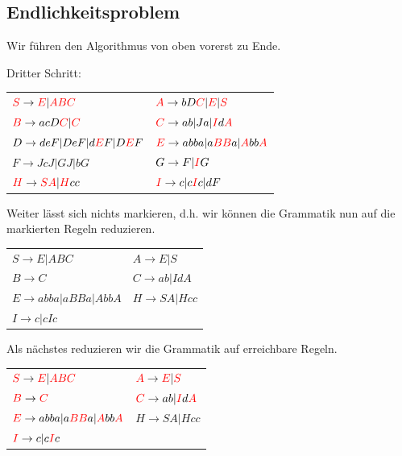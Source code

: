 \documentclass{article}
\begin{document}
\subsection*{Endlichkeitsproblem}
Wir führen den Algorithmus von oben vorerst zu Ende.
\begin{center}
Dritter Schritt:\\
\begin{tabular}{ll}
${\color{red}S} \rightarrow {\color{red}E} | {\color{red}ABC}$  & ${\color{red}A} \rightarrow bD{\color{red}C} | {\color{red}E} | {\color{red}S}$ \\
${\color{red}B} \rightarrow acD{\color{red}C} | {\color{red}C}$ & ${\color{red}C} \rightarrow ab | Ja | {\color{red}I}d{\color{red}A}$ \\
$D \rightarrow deF | DeF | d{\color{red}E}F | D{\color{red}E}F$ & ${\color{red}E} \rightarrow abba | a{\color{red}BB}a | {\color{red}A}bb{\color{red}A}$ \\
$F \rightarrow JcJ | GJ | bG$                                   & $G \rightarrow F | {\color{red}I}G$ \\
${\color{red}H} \rightarrow {\color{red}SA} | {\color{red}H}cc$ & ${\color{red}I} \rightarrow c | c{\color{red}I}c | dF$
\end{tabular}
\end{center}
Weiter lässt sich nichts markieren, d.h. wir können die Grammatik nun auf die markierten Regeln reduzieren.
\begin{center}
\begin{tabular}{ll}
$S \rightarrow E | ABC$            & $A \rightarrow E | S$ \\
$B \rightarrow C$                  & $C \rightarrow ab | IdA$ \\
$E \rightarrow abba | aBBa | AbbA$ & $H \rightarrow SA | Hcc$ \\
$I \rightarrow c | cIc$            & \\
\end{tabular}
\end{center}
Als nächstes reduzieren wir die Grammatik auf erreichbare Regeln.
\begin{center}
\begin{tabular}{ll}
${\color{red}S} \rightarrow {\color{red}E} | {\color{red}ABC}$                         & ${\color{red}A} \rightarrow {\color{red}E} | {\color{red}S}$ \\
${\color{red}B} \rightarrow {\color{red}C}$                                            & ${\color{red}C} \rightarrow ab | {\color{red}I}d{\color{red}A}$ \\
${\color{red}E} \rightarrow abba | a{\color{red}BB}a | {\color{red}A}bb{\color{red}A}$ & $H \rightarrow SA | Hcc$ \\
${\color{red}I} \rightarrow c | c{\color{red}I}c$                                      & \\
\end{tabular}
\end{center}
\end{document}
